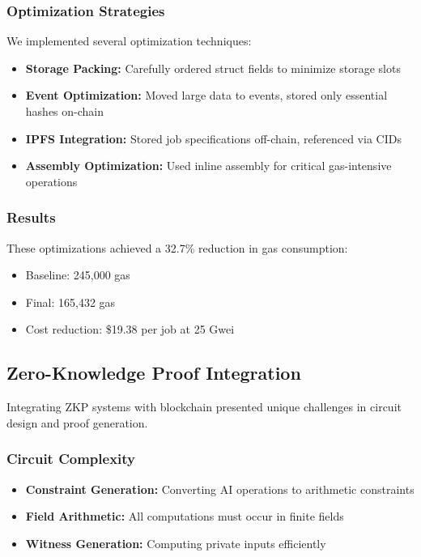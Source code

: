 \subsubsection{Optimization Strategies}
We implemented several optimization techniques:
\begin{itemize}
    \item \textbf{Storage Packing:} Carefully ordered struct fields to minimize storage slots
    \item \textbf{Event Optimization:} Moved large data to events, stored only essential hashes on-chain
    \item \textbf{IPFS Integration:} Stored job specifications off-chain, referenced via CIDs
    \item \textbf{Assembly Optimization:} Used inline assembly for critical gas-intensive operations
\end{itemize}

\subsubsection{Results}
These optimizations achieved a 32.7\% reduction in gas consumption:
\begin{itemize}
    \item Baseline: 245,000 gas
    \item Final: 165,432 gas
    \item Cost reduction: \$19.38 per job at 25 Gwei
\end{itemize}

\subsection{Zero-Knowledge Proof Integration}

Integrating ZKP systems with blockchain presented unique challenges in circuit design and proof generation.

\subsubsection{Circuit Complexity}
\begin{itemize}
    \item \textbf{Constraint Generation:} Converting AI operations to arithmetic constraints
    \item \textbf{Field Arithmetic:} All computations must occur in finite fields
    \item \textbf{Witness Generation:} Computing private inputs efficiently
\end{itemize}

